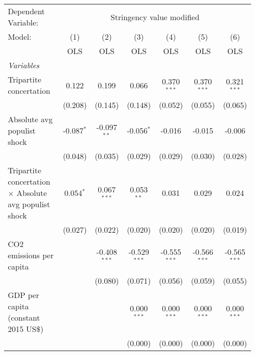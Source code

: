 
\begingroup
\centering
\begin{tabular}{lcccccc}
   \toprule
   Dependent Variable: & \multicolumn{6}{c}{Stringency value modified}\\
   Model:                                                        & (1)          & (2)            & (3)            & (4)            & (5)            & (6)\\  
                                                                 &  OLS         & OLS            & OLS            & OLS            & OLS            & OLS\\  
   \midrule
   \emph{Variables}\\
   Tripartite concertation                                       & 0.122        & 0.199          & 0.066          & 0.370$^{***}$  & 0.370$^{***}$  & 0.321$^{***}$\\   
                                                                 & (0.208)      & (0.145)        & (0.148)        & (0.052)        & (0.055)        & (0.065)\\   
   Absolute avg populist shock                                   & -0.087$^{*}$ & -0.097$^{**}$  & -0.056$^{*}$   & -0.016         & -0.015         & -0.006\\   
                                                                 & (0.048)      & (0.035)        & (0.029)        & (0.029)        & (0.030)        & (0.028)\\   
   Tripartite concertation $\times$ Absolute avg populist shock  & 0.054$^{*}$  & 0.067$^{***}$  & 0.053$^{**}$   & 0.031          & 0.029          & 0.024\\   
                                                                 & (0.027)      & (0.022)        & (0.020)        & (0.020)        & (0.020)        & (0.019)\\   
   CO2 emissions per capita                                      &              & -0.408$^{***}$ & -0.529$^{***}$ & -0.555$^{***}$ & -0.566$^{***}$ & -0.565$^{***}$\\   
                                                                 &              & (0.080)        & (0.071)        & (0.056)        & (0.059)        & (0.055)\\   
   GDP per capita (constant 2015 US\$)                           &              &                & 0.000$^{***}$  & 0.000$^{***}$  & 0.000$^{***}$  & 0.000$^{***}$\\   
                                                                 &              &                & (0.000)        & (0.000)        & (0.000)        & (0.000)\\   

\end{tabular}
